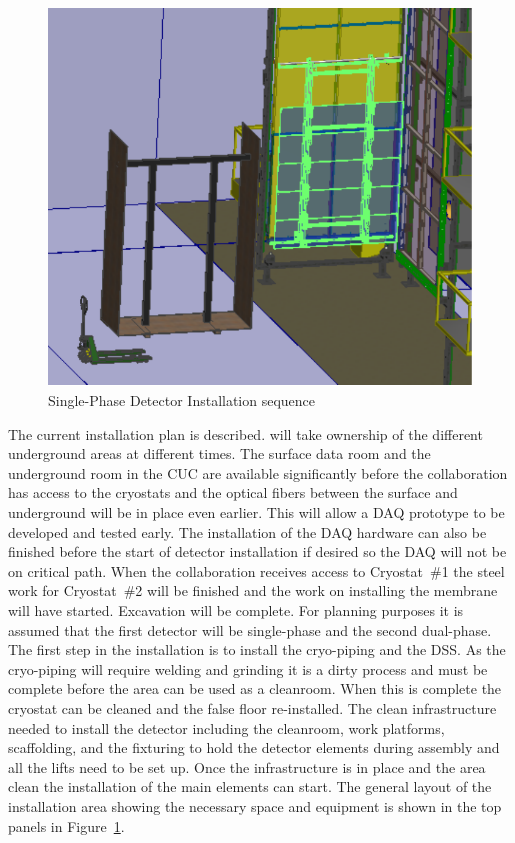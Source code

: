 \begin{figure}[!htb]
\begin{center}
\begin{minipage}[c]{0.32\textwidth}
\end{minipage}
\begin{minipage}[c]{0.32\textwidth}
\includegraphics[width=\textwidth]{far-detector-single-phase/figures/CPA-3.pdf}
\end{minipage}

\caption{Single-Phase Detector Installation sequence}
\label{Install-Seq}
\end{center}
\end{figure}

The current installation plan is described.  will take
ownership of the different underground areas at different times. The
surface data room and the underground room in the CUC are available
significantly before the collaboration has access to the cryostats and
the optical fibers between the surface and underground will be in
place even earlier. This will allow a DAQ prototype to be developed
and tested early. The installation of the DAQ hardware can also be
finished before the start of detector installation if desired so the
DAQ will not be on critical path.  When the collaboration receives
access to Cryostat~\#1 the steel work for Cryostat~\#2 will be
finished and the work on installing the membrane will have
started. Excavation will be complete.  For planning purposes it is assumed that the first detector will be single-phase and the second dual-phase. The first step in the  
installation is to install the cryo-piping and the DSS. As the
cryo-piping will require welding and grinding it is a dirty process
and must be complete before the area can be used as a cleanroom. When
this is complete the cryostat can be cleaned and the false floor
re-installed. The clean infrastructure needed to install the detector
including the cleanroom, work platforms, scaffolding, and the
fixturing to hold the detector elements during assembly and all the
lifts need to be set up. Once the infrastructure is in place and the area
clean the installation of the main elements can start. The general
layout of the installation area showing the necessary space and
equipment is shown in the top panels in Figure~\ref{Install-Seq}.

